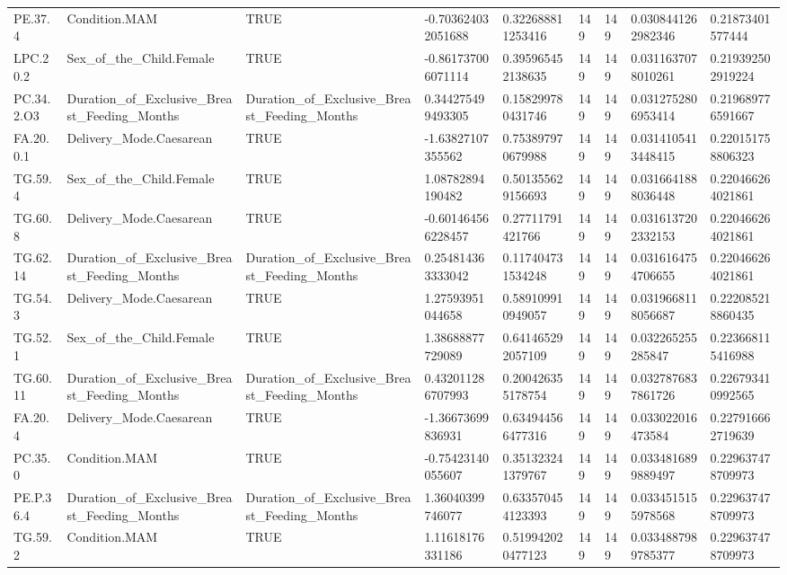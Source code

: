 \begin{longtable}{lllllllll}
PE.37.4 & Condition.MAM & TRUE & -0.703624032051688 & 0.322688811253416 & 149 & 149 & 0.0308441262982346 & 0.21873401577444 \\
LPC.20.2 & Sex\_of\_the\_Child.Female & TRUE & -0.861737006071114 & 0.395965452138635 & 149 & 149 & 0.0311637078010261 & 0.219392502919224 \\
PC.34.2.O3 & Duration\_of\_Exclusive\_Breast\_Feeding\_Months & Duration\_of\_Exclusive\_Breast\_Feeding\_Months & 0.344275499493305 & 0.158299780431746 & 149 & 149 & 0.0312752806953414 & 0.219689776591667 \\
FA.20.0.1 & Delivery\_Mode.Caesarean & TRUE & -1.63827107355562 & 0.753897970679988 & 149 & 149 & 0.0314105413448415 & 0.220151758806323 \\
TG.59.4 & Sex\_of\_the\_Child.Female & TRUE & 1.08782894190482 & 0.501355629156693 & 149 & 149 & 0.0316641888036448 & 0.220466264021861 \\
TG.60.8 & Delivery\_Mode.Caesarean & TRUE & -0.601464566228457 & 0.27711791421766 & 149 & 149 & 0.0316137202332153 & 0.220466264021861 \\
TG.62.14 & Duration\_of\_Exclusive\_Breast\_Feeding\_Months & Duration\_of\_Exclusive\_Breast\_Feeding\_Months & 0.254814363333042 & 0.117404731534248 & 149 & 149 & 0.0316164754706655 & 0.220466264021861 \\
TG.54.3 & Delivery\_Mode.Caesarean & TRUE & 1.27593951044658 & 0.589109910949057 & 149 & 149 & 0.0319668118056687 & 0.222085218860435 \\
TG.52.1 & Sex\_of\_the\_Child.Female & TRUE & 1.38688877729089 & 0.641465292057109 & 149 & 149 & 0.032265255285847 & 0.223668115416988 \\
TG.60.11 & Duration\_of\_Exclusive\_Breast\_Feeding\_Months & Duration\_of\_Exclusive\_Breast\_Feeding\_Months & 0.432011286707993 & 0.200426355178754 & 149 & 149 & 0.0327876837861726 & 0.226793410992565 \\
FA.20.4 & Delivery\_Mode.Caesarean & TRUE & -1.36673699836931 & 0.634944566477316 & 149 & 149 & 0.033022016473584 & 0.227916662719639 \\
PC.35.0 & Condition.MAM & TRUE & -0.75423140055607 & 0.351323241379767 & 149 & 149 & 0.0334816899889497 & 0.229637478709973 \\
PE.P.36.4 & Duration\_of\_Exclusive\_Breast\_Feeding\_Months & Duration\_of\_Exclusive\_Breast\_Feeding\_Months & 1.36040399746077 & 0.633570454123393 & 149 & 149 & 0.0334515155978568 & 0.229637478709973 \\
TG.59.2 & Condition.MAM & TRUE & 1.11618176331186 & 0.519942020477123 & 149 & 149 & 0.0334887989785377 & 0.229637478709973 \\

\end{longtable}
